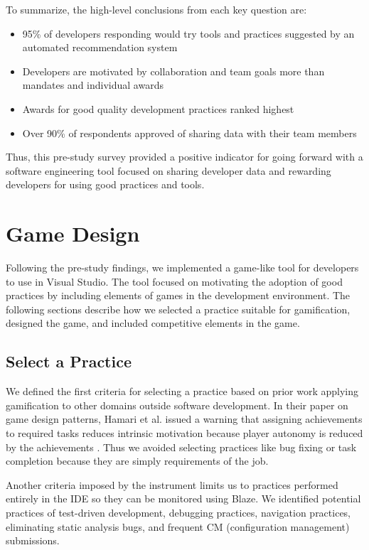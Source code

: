 \documentclass{sig-alternate}
\begin{document}
 To summarize, the high-level conclusions from each key question are:
\begin{itemize}[itemsep=0mm]
\item 95\% of developers responding would try tools and practices suggested by an automated recommendation system 
\item Developers are motivated by collaboration and team goals more than mandates and individual awards
\item Awards for good quality development practices ranked highest
\item Over 90\% of respondents approved of sharing data with their team members
\end{itemize}
Thus, this pre-study survey provided a positive indicator for going forward with a software engineering tool focused on sharing developer data and rewarding developers for using good practices and tools. 

\section{Game Design}


Following the pre-study findings, we implemented a game-like tool for developers to use in Visual Studio.  The tool focused on motivating the adoption of good practices by including elements of games in the development environment.  The following sections describe how we selected a practice suitable for gamification, designed the game, and included competitive elements in the game.

\subsection{Select a Practice}

We defined the first criteria for selecting a practice based on prior work  applying gamification to other domains outside software development. 
In their paper on game design patterns, Hamari et al. issued a warning that assigning achievements to required tasks reduces intrinsic motivation because player autonomy is reduced by the achievements \cite{wbsnipes:Hamari2011Framework}.  Thus we avoided selecting practices like bug fixing or task completion because they are simply requirements of the job.  

Another criteria imposed by the instrument limits us to practices performed entirely in the IDE so they can be monitored using Blaze.  We identified potential practices of test-driven development, debugging practices, navigation practices,  eliminating static analysis bugs, and frequent CM (configuration management) submissions.  
\end{document}
